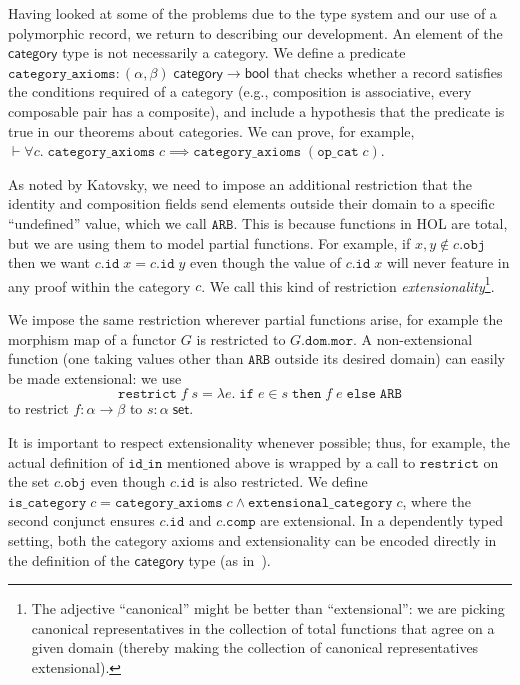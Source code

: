 \documentclass[twoside,titlepage,11pt]{article}
\begin{document}
Having looked at some of the problems due to the type system and our use of a polymorphic record, we return to describing our development.
An element of the $\mathsf{category}$ type is not necessarily a category.
We define a predicate $\mathtt{category\_axioms}:(\alpha,\beta)\;\mathsf{category}\to\mathsf{bool}$ that checks whether a record satisfies the conditions required of a category (e.g., composition is associative, every composable pair has a composite), and include a hypothesis that the predicate is true in our theorems about categories.
We can prove, for example, $\vdash\forall{c}.\;\mathtt{category\_axioms}\;c\implies\mathtt{category\_axioms}\;(\mathtt{op\_cat}\;c)$.

As noted by Katovsky, we need to impose an additional restriction that the identity and composition fields send elements outside their domain to a specific ``undefined'' value, which we call $\mathtt{ARB}$.
This is because functions in HOL are total, but we are using them to model partial functions.
For example, if $x,y\notin c.\mathtt{obj}$ then we want $c.\mathtt{id}\;x=c.\mathtt{id}\;y$ even though the value of $c.\mathtt{id}\;x$ will never feature in any proof within the category $c$.
We call this kind of restriction \emph{extensionality}\footnote{The adjective ``canonical'' might be better than ``extensional'': we are picking canonical representatives in the collection of total functions that agree on a given domain (thereby making the collection of canonical representatives extensional).}.

We impose the same restriction wherever partial functions arise, for example the morphism map of a functor $G$ is restricted to $G.\mathtt{dom}.\mathtt{mor}$.
A non-extensional function (one taking values other than $\mathtt{ARB}$ outside its desired domain) can easily be made extensional: we use $$\mathtt{restrict}\;f\;s=\lambda{e}.\;\mathtt{if}\;e\in s\;\mathtt{then}\;f\;e\;\mathtt{else}\;\mathtt{ARB}$$ to restrict $f:\alpha\to\beta$ to $s:\alpha\;\mathsf{set}$.

It is important to respect extensionality whenever possible; thus, for example, the actual definition of $\mathtt{id\_in}$ mentioned above is wrapped by a call to $\mathtt{restrict}$ on the set $c.\mathtt{obj}$ even though $c.\mathtt{id}$ is also restricted.
We define $\mathtt{is\_category}\;c=\mathtt{category\_axioms}\;c\land\mathtt{extensional\_category}\;c$, where the second conjunct ensures $c.\mathtt{id}$ and $c.\mathtt{comp}$ are extensional.
In a dependently typed setting, both the category axioms and extensionality can be encoded directly in the definition of the $\mathsf{category}$ type (as in~\cite{DBLP:conf/birthday/HuetS00,Sozeau,Megacz}).
\end{document}
